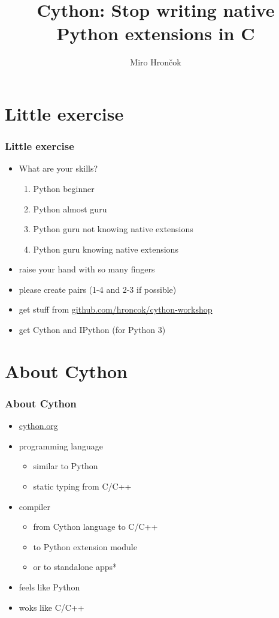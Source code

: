 \documentclass{beamer}
\title{Cython: Stop writing native Python extensions in C}
\author{Miro Hrončok}
\institute[D2016]{DevConf.cz 2016}
\begin{document}
\begin{frame}
  \titlepage
\end{frame}



\section{Little exercise}

\begin{frame}
  \frametitle{Little exercise}
    \begin{itemize}
      \item What are your skills?
      \begin{enumerate}
        \item Python beginner
        \item Python almost guru
        \item Python guru not knowing native extensions
        \item Python guru knowing native extensions
      \end{enumerate}
      \item raise your hand with so many fingers
      \item please create pairs (1-4 and 2-3 if possible)
      \item get stuff from \href{https://github.com/hroncok/cython-workshop}{github.com/hroncok/cython-workshop}
      \item get Cython and IPython (for Python 3)
    \end{itemize}
\end{frame}

\section{About Cython}

\begin{frame}
  \frametitle{About Cython}
    \begin{itemize}
      \item \href{http://cython.org/}{cython.org}
      \item programming language
        \begin{itemize}
          \item similar to Python
          \item static typing from C/C++
        \end{itemize}
      \item compiler
        \begin{itemize}
          \item from Cython language to C/C++
          \item to Python extension module
          \item or to standalone apps*
        \end{itemize}
      \item feels like Python
      \item woks like C/C++
    \end{itemize}
\end{frame}
\end{document}
